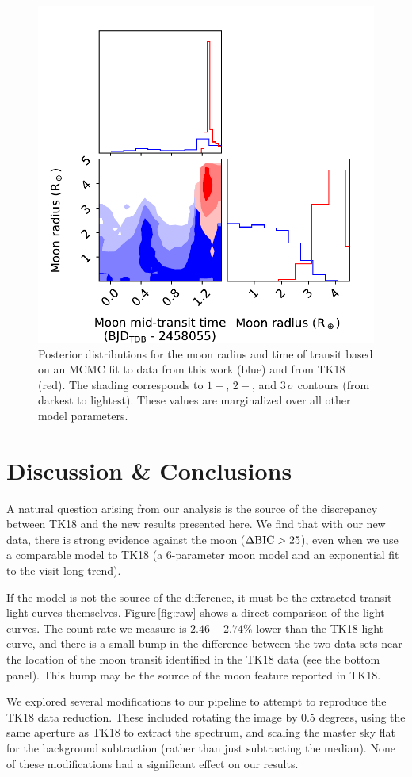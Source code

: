 \documentclass[twocolumn]{aastex62}
\begin{document}
\begin{figure}
\includegraphics[width = 0.5 \textwidth]{figures/fig5_pairs.pdf}
    \caption{Posterior distributions for the moon radius and time of transit based on an MCMC fit to data from this work (blue) and from TK18 (red). The shading corresponds to $1-$, $2-$, and $3\,\sigma$ contours (from darkest to lightest). These values are marginalized over all other model parameters.} 
\label{fig:corner}
\end{figure}

\section{Discussion \& Conclusions}
A natural question arising from our analysis is the source of the discrepancy between TK18 and the new results presented here. We find that with our new data, there is strong evidence against the moon ($\Delta\rm{BIC} > 25$), even when we use a comparable model to TK18 (a 6-parameter moon model and an exponential fit to the visit-long trend).

If the model is not the source of the difference, it must be the extracted transit light curves themselves.  Figure\,\ref{fig:raw} shows a direct comparison of the light curves. The count rate we measure is $2.46 -2.74\%$ lower than the TK18 light curve, and there is a small bump in the difference between the two data sets near the location of the moon transit identified in the TK18 data (see the bottom panel). This bump may be the source of the moon feature reported in TK18.

 We explored several modifications to our pipeline to attempt to reproduce the TK18 data reduction. These included rotating the image by 0.5 degrees, using the same aperture as TK18 to extract the spectrum, and scaling the master sky flat for the background subtraction (rather than just subtracting the median). None of these modifications had a significant effect on our results. 
\end{document}
